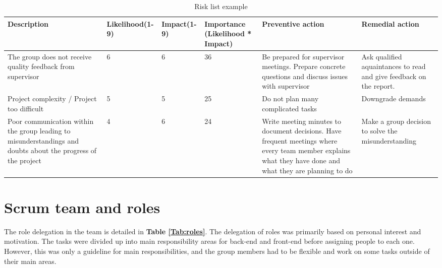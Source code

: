 \begin{center}
	\begin{longtable}{ | p{3.5cm} | p{2cm} | p{1.5cm} | p{2cm} | p{3.5cm} | p{3.5cm}|}
		
		\caption[Risk list example]{Risk list example } \label{Tab:riskexample}\\
		\hline
		\textbf{Description} & \textbf{Likelihood(1-9)} & \textbf{Impact(1-9)} & \textbf{Importance (Likelihood * Impact)} & \textbf{Preventive action} & \textbf{Remedial action}\\ \hline
		
		The group does not receive quality feedback from supervisor & 6 & 6 & 36 & Be prepared for supervisor meetings. Prepare concrete questions and discuss issues with supervisor & Ask qualified aquaintances to read and give feedback on the report. \\ \hline
		
		Project complexity / Project too difficult & 5 & 5 & 25 & Do not plan many complicated tasks & Downgrade demands \\ \hline  
		
		Poor communication within the group leading to misunderstandings and doubts about the progress of the project & 4 & 6 & 24 & Write meeting minutes to document decisions. Have frequent meetings where every team member explains what they have done and what they are planning to do & Make a group decision to solve the misunderstanding \\ \hline

	\end{longtable}
\end{center}


\section{Scrum team and roles}
\label{sec:scrum_team_and_roles}

The role delegation in the team is detailed in \textbf{Table \ref{Tab:roles}}. The delegation of roles was primarily based on personal interest and motivation. The tasks were divided up into main responsibility areas for back-end and front-end before assigning people to each one. However, this was only a guideline for main responsibilities, and the group members had to be flexible and work on some tasks outside of their main areas.

